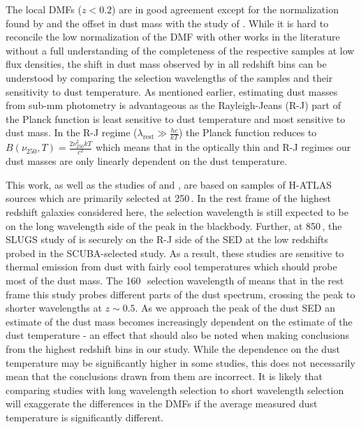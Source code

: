 The local DMFs ($z < 0.2$) are in good agreement except for the normalization found by \citealt{Dunne_2011} and the offset in dust mass with the study of \citealt{Pozzi_2020}. While it is hard to reconcile the low normalization of the \citealt{Dunne_2011} DMF with other works in the literature without a full understanding of the completeness of the respective samples at low flux densities, the shift in dust mass observed by \citealt{Pozzi_2020} in all redshift bins can be understood by comparing the selection wavelengths of the samples and their sensitivity to dust temperature. As mentioned earlier, estimating dust masses from sub-mm photometry is advantageous as the Rayleigh-Jeans (R-J) part of the Planck function is least sensitive to dust temperature and most sensitive to dust mass. In the R-J regime ($\lambda_{\textrm{rest}} \gg \frac{hc}{kT}$) the Planck function reduces to $B(\nu_{250}, T) = \frac{2\nu_{250}^{2}kT}{c^2}$ which means that in the optically thin and R-J regimes our dust masses are only linearly dependent on the dust temperature.

This work, as well as the studies of \citealt{Dunne_2011} and \citealt{Beeston_2018}, are based on samples of H-ATLAS sources which are primarily selected at 250\,\micron. In the rest frame of the highest redshift galaxies considered here, the selection wavelength is still expected to be on the long wavelength side of the peak in the blackbody. Further, at 850\,\micron, the SLUGS study of \citealt{Vlahakis_2005} is securely on the R-J side of the SED at the low redshifts probed in the SCUBA-selected study. As a result, these studies are sensitive to thermal emission from dust with fairly cool temperatures which should probe most of the dust mass. The 160\,\micron\ selection wavelength of \citealt{Pozzi_2020} means that in the rest frame this study probes different parts of the dust spectrum, crossing the peak to shorter wavelengths at $z \sim 0.5$. As we approach the peak of the dust SED an estimate of the dust mass becomes increasingly dependent on the estimate of the dust temperature - an effect that should also be noted when making conclusions from the highest redshift bins in our study. While the dependence on the dust temperature may be significantly higher in some studies, this does not necessarily mean that the conclusions drawn from them are incorrect. It is likely that comparing studies with long wavelength selection to short wavelength selection will exaggerate the differences in the DMFs if the average measured dust temperature is significantly different.

